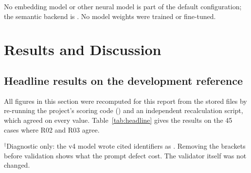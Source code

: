 No embedding model or other neural model is part of the default configuration; the semantic backend is . No model weights were trained or fine-tuned.

\section{Results and Discussion}
\label{sec:results}

\subsection{Headline results on the development reference}

All figures in this section were recomputed for this report from the stored files by re-running the project's scoring code () and an independent recalculation script, which agreed on every value. Table~\ref{tab:headline} gives the results on the 45 cases where R02 and R03 agree.

\begin{table}[H]
\centering
\small
\renewcommand{\arraystretch}{1.2}

\vspace{0.2cm}
{\footnotesize $^{\dagger}$Diagnostic only: the v4 model wrote cited identifiers as \code{[L1]}. Removing the brackets before validation shows what the prompt defect cost. The validator itself was not changed.}
\caption[{Results against the R02/R03 agreement (45 development cases)}]{Results against the R02/R03 agreement (45 cases, development reference, AI-assisted). Intervals are 95\% Wilson intervals.}
\label{tab:headline}
\end{table}

